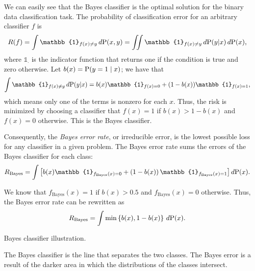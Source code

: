 We can easily see that the Bayes classifier is the optimal solution for the binary data
classification task.  The probability of classification error for an arbitrary classifier
$f$ is
\begin{equation*}
  R(f) = \int \mathbb{1}_{f(x) \neq y}\, d\!\Prob(x, y) =
    \iint \mathbb{1}_{f(x) \neq y}\, d\!\Prob(y | x)\, d\!\Prob(x)\text{,}
\end{equation*}
where $\mathbb{1}_{\cdot}$ is the indicator function that returns one if the condition is
true and zero otherwise.  Let $b(x) = \operatorname{P}(y = 1 \mid x)$; we have that
\[
  \int \mathbb{1}_{f(x) \neq y}\, d\!\Prob(y | x) =
    b(x) \mathbb{1}_{f(x) = 0} + (1 - b(x)) \mathbb{1}_{f(x) = 1}\text{,}
\]
which means only one of the terms is nonzero for each $x$.  Thus, the risk is minimized by choosing
a classifier that $f(x) = 1$ if $b(x) > 1 - b(x)$ and $f(x) = 0$ otherwise.  This is the
Bayes classifier.

Consequently, the \emph{Bayes error rate}, or irreducible error, is the lowest possible loss for any
classifier in a given problem.  The Bayes error rate sums the errors of the
Bayes classifier for each class:
\begin{equation*}
  R_\text{Bayes} = \int \left[
    b(x) \mathbb{1}_{f_\text{Bayes}(x) = 0} +
    \left(1 - b(x)\right) \mathbb{1}_{f_\text{Bayes}(x) = 1}
  \right] d\!\Prob(x)\text{.}
\end{equation*}

We know that $f_\text{Bayes}(x) = 1$ if $b(x) > 0.5$ and $f_\text{Bayes}(x) = 0$ otherwise.
Thus, the Bayes error rate can be rewritten as
\begin{equation*}
  R_\text{Bayes} = \int \min\left\{ b(x), 1 - b(x) \right\}\, d\!\operatorname{P}(x)\text{.}
\end{equation*}

\begin{figurebox}[label=fig:bayes-classifier]{Bayes classifier illustration.}
  \centering
  \tcblower
  The Bayes classifier is the line that separates the two classes.  The Bayes error is a
  result of the darker area in which the distributions of the classes intersect.
\end{figurebox}

